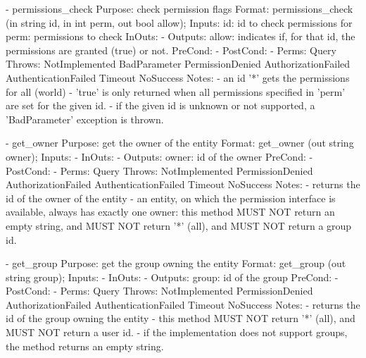 \begin{myspec}
 
    - permissions_check
      Purpose:  check permission flags
      Format:   permissions_check    (in  string     id,
                                      in  int        perm,
                                      out bool       allow);
      Inputs:   id:                   id to check permissions for
                perm:                 permissions to check
      InOuts:   -
      Outputs:  allow:                indicates if, for that id,
                                      the permissions are granted
                                      (true) or not.
      PreCond:  -
      PostCond: -
      Perms:    Query
      Throws:   NotImplemented
                BadParameter
                PermissionDenied
                AuthorizationFailed
                AuthenticationFailed
                Timeout
                NoSuccess
      Notes:    - an id '*' gets the permissions for all (world)
                - 'true' is only returned when all permissions
                  specified in 'perm' are set for the given id.
                - if the given id is unknown or not supported, a
                  'BadParameter' exception is thrown.
 
 
    - get_owner 
      Purpose:  get the owner of the entity
      Format:   get_owner            (out string     owner);
      Inputs:   -
      InOuts:   -
      Outputs:  owner:                id of the owner
      PreCond:  -
      PostCond: -
      Perms:    Query
      Throws:   NotImplemented
                PermissionDenied
                AuthorizationFailed
                AuthenticationFailed
                Timeout
                NoSuccess
      Notes:    - returns the id of the owner of the entity
                - an entity, on which the permission interface is
                  available, always has exactly one owner: this 
                  method MUST NOT return an empty string, and 
                  MUST NOT return '*' (all), and MUST NOT return 
                  a group id.
 
 
    - get_group 
      Purpose:  get the group owning the entity
      Format:   get_group            (out string     group);
      Inputs:   -
      InOuts:   -
      Outputs:  group:                id of the group
      PreCond:  -
      PostCond: -
      Perms:    Query
      Throws:   NotImplemented
                PermissionDenied
                AuthorizationFailed
                AuthenticationFailed
                Timeout
                NoSuccess
      Notes:    - returns the id of the group owning the entity
                - this method MUST NOT return '*' (all), and 
                  MUST NOT return a user id.
                - if the implementation does not support groups, 
                  the method returns an empty string.
 \end{myspec}
 

